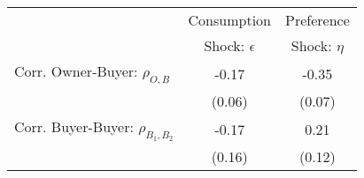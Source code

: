 \begin{tabular}{lcc}
& Consumption & Preference  \\
& Shock: $\epsilon$ & Shock: $\eta$ \\
\hline
Corr. Owner-Buyer: $\rho_{O,B}$ &-0.17&-0.35\\
  & (0.06) & (0.07) \\
Corr. Buyer-Buyer: $\rho_{B_1,B_2}$ &-0.17&0.21\\
 & (0.16) & (0.12) \\
\end{tabular}
